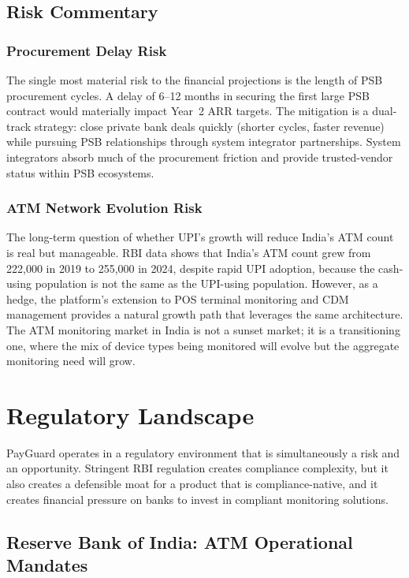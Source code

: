 \documentclass[12pt,a4paper]{article}
\begin{document}
\subsection{Risk Commentary}

\subsubsection{Procurement Delay Risk}

The single most material risk to the financial projections is the length of PSB procurement
cycles. A delay of 6--12 months in securing the first large PSB contract would materially
impact Year~2 ARR targets. The mitigation is a dual-track strategy: close private bank deals
quickly (shorter cycles, faster revenue) while pursuing PSB relationships through system
integrator partnerships. System integrators absorb much of the procurement friction and provide
trusted-vendor status within PSB ecosystems.

\subsubsection{ATM Network Evolution Risk}

The long-term question of whether UPI's growth will reduce India's ATM count is real but
manageable. RBI data shows that India's ATM count grew from 222,000 in 2019 to 255,000 in
2024, despite rapid UPI adoption, because the cash-using population is not the same as the
UPI-using population. However, as a hedge, the platform's extension to POS terminal monitoring
and CDM management provides a natural growth path that leverages the same architecture. The
ATM monitoring market in India is not a sunset market; it is a transitioning one, where
the mix of device types being monitored will evolve but the aggregate monitoring need will grow.

\newpage

\section{Regulatory Landscape}

PayGuard operates in a regulatory environment that is simultaneously a risk and an opportunity.
Stringent RBI regulation creates compliance complexity, but it also creates a defensible moat
for a product that is compliance-native, and it creates financial pressure on banks to invest
in compliant monitoring solutions.

\subsection{Reserve Bank of India: ATM Operational Mandates}
\end{document}
